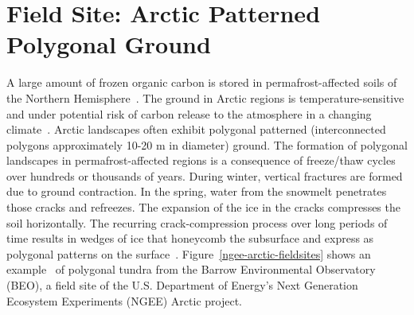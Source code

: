 \section{Field Site: Arctic Patterned Polygonal Ground}\label{field-site}
A large amount of frozen organic carbon is stored in permafrost-affected soils of the Northern Hemisphere~\citet{schuur2015climate,bg-11-6573-2014}.
The ground in Arctic regions is temperature-sensitive and under potential risk of carbon release to the atmosphere in a changing climate~\citet{hinzman2005evidence}.
Arctic landscapes often exhibit polygonal patterned (interconnected polygons approximately 10-20 m in diameter) ground.
The formation of polygonal landscapes in permafrost-affected regions is a consequence of freeze/thaw cycles over hundreds or thousands of years.
During winter, vertical fractures are formed due to ground contraction. In the spring, water from the snowmelt penetrates those cracks and refreezes.
The expansion of the ice in the cracks compresses the soil horizontally.
The recurring crack-compression process over long periods of time results in wedges of ice that honeycomb the subsurface and express as polygonal patterns on the surface~\citet{lachenbruch1962mechanics,greene1963contraction,mackay1990some,mackay2004thermally}.
Figure~\ref{ngee-arctic-fieldsites} shows an example~\citet{kumar2016modeling} of polygonal tundra from the Barrow Environmental Observatory (BEO), a field site of the U.S. Department of Energy's Next Generation Ecosystem Experiments (NGEE) Arctic project.
%
